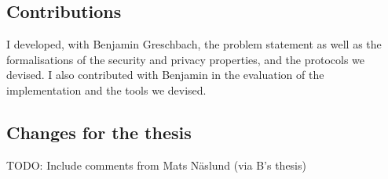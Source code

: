 \subsection{Contributions}
I developed, with Benjamin Greschbach, the problem statement as well as the formalisations 
of the security and privacy properties, and the protocols we devised. I also contributed 
with Benjamin in the evaluation of the implementation and the tools we devised.

\subsection{Changes for the thesis}
TODO: Include comments from Mats Näslund (via B's thesis)
%
  


\section{}
\begingroup\centering
\begin{ppBox}
\end{ppBox}
\endgroup


